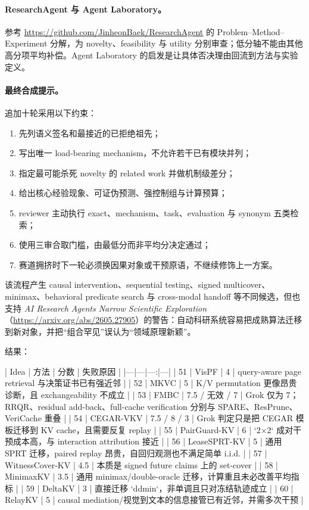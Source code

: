 \documentclass[UTF8,zihao=-4,a4paper]{ctexart}
\begin{document}
\paragraph{ResearchAgent 与 Agent Laboratory。}
参考 \url{https://github.com/JinheonBaek/ResearchAgent} 的 Problem--Method--Experiment 分解，为 novelty、feasibility 与 utility 分别审查；低分轴不能由其他高分项平均补偿。Agent Laboratory 的启发是让具体否决理由回流到方法与实验定义。

\paragraph{最终合成提示。}
追加十轮采用以下约束：

\begin{enumerate}
  \item 先列语义签名和最接近的已拒绝祖先；
  \item 写出唯一 load-bearing mechanism，不允许若干已有模块并列；
  \item 指定最可能杀死 novelty 的 related work 并做机制级差分；
  \item 给出核心经验现象、可证伪预测、强控制组与计算预算；
  \item reviewer 主动执行 exact、mechanism、task、evaluation 与 synonym 五类检索；
  \item 使用三审合取门槛，由最低分而非平均分决定通过；
  \item 赛道拥挤时下一轮必须换因果对象或干预原语，不继续修饰上一方案。
\end{enumerate}

该流程产生 causal intervention、sequential testing、signed multicover、minimax、behavioral predicate search 与 cross-modal handoff 等不同候选，但也支持 \emph{AI Research Agents Narrow Scientific Exploration}（\url{https://arxiv.org/abs/2605.27905}）的警告：自动科研系统容易把成熟算法迁移到新对象，并把“组合罕见”误认为“领域原理新颖”。

结果：

| Idea | 方法 | 分数 | 失败原因 |
|---|---|---:|---|
| 51 | VisPF | 4 | query-aware page retrieval 与决策证书已有强近邻 |
| 52 | MKVC | 5 | K/V permutation 更像昂贵诊断，且 exchangeability 不成立 |
| 53 | FMBC | 7.5 / 无效 / 7 | Grok 仅为 7；RRQR、residual add-back、full-cache verification 分别与 SPARE、ResPrune、VeriCache 重叠 |
| 54 | CEGAR-VKV | 7.5 / 8 / 3 | Grok 判定只是把 CEGAR 模板迁移到 KV cache，且需要反复 replay |
| 55 | PairGuard-KV | 6 | `2×2` 成对干预成本高，与 interaction attribution 接近 |
| 56 | LeaseSPRT-KV | 5 | 通用 SPRT 迁移，paired replay 昂贵，自回归观测也不满足简单 i.i.d. |
| 57 | WitnessCover-KV | 4.5 | 本质是 signed future claims 上的 set-cover |
| 58 | MinimaxKV | 3.5 | 通用 minimax/double-oracle 迁移，计算重且未必改善平均指标 |
| 59 | DeltaKV | 3 | 直接迁移 `ddmin`，非单调且只对冻结轨迹成立 |
| 60 | RelayKV | 5 | causal mediation/视觉到文本的信息接管已有近邻，并需多次干预 |
\end{document}
